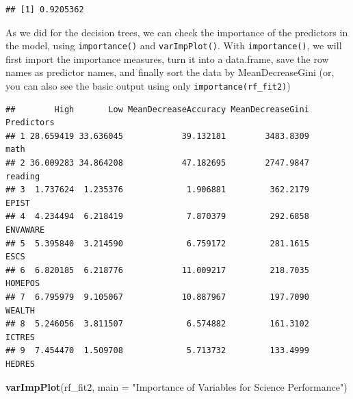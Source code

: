 \documentclass[]{book}
\newenvironment{Shaded}{\begin{snugshade}}{\end{snugshade}}
\newcommand{\DataTypeTok}[1]{\textcolor[rgb]{0.13,0.29,0.53}{#1}}
\newcommand{\KeywordTok}[1]{\textcolor[rgb]{0.13,0.29,0.53}{\textbf{#1}}}
\newcommand{\NormalTok}[1]{#1}
\newcommand{\OperatorTok}[1]{\textcolor[rgb]{0.81,0.36,0.00}{\textbf{#1}}}
\newcommand{\StringTok}[1]{\textcolor[rgb]{0.31,0.60,0.02}{#1}}
\begin{document}
\begin{Shaded}
\end{Shaded}

\begin{verbatim}
## [1] 0.9205362
\end{verbatim}

As we did for the decision trees, we can check the importance of the predictors in the model, using \texttt{importance()} and \texttt{varImpPlot()}. With \texttt{importance()}, we will first import the importance measures, turn it into a data.frame, save the row names as predictor names, and finally sort the data by MeanDecreaseGini (or, you can also see the basic output using only \texttt{importance(rf\_fit2)})

\begin{Shaded}
\end{Shaded}

\begin{verbatim}
##        High       Low MeanDecreaseAccuracy MeanDecreaseGini Predictors
## 1 28.659419 33.636045            39.132181        3483.8309       math
## 2 36.009283 34.864208            47.182695        2747.9847    reading
## 3  1.737624  1.235376             1.906881         362.2179      EPIST
## 4  4.234494  6.218419             7.870379         292.6858   ENVAWARE
## 5  5.395840  3.214590             6.759172         281.1615       ESCS
## 6  6.820185  6.218776            11.009217         218.7035    HOMEPOS
## 7  6.795979  9.105067            10.887967         197.7090     WEALTH
## 8  5.246056  3.811507             6.574882         161.3102     ICTRES
## 9  7.454470  1.509708             5.713732         133.4999     HEDRES
\end{verbatim}

\begin{Shaded}
\begin{Highlighting}[]
\KeywordTok{varImpPlot}\NormalTok{(rf_fit2, }
           \DataTypeTok{main =} \StringTok{"Importance of Variables for Science Performance"}\NormalTok{)}
\end{Highlighting}
\end{Shaded}
\end{document}
